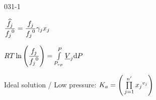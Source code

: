 \begin{mitframe}{031-1}
\begin{listone}
\begin{listtwo}
\begin{listthree}
\begin{listfour}
                \item $\dfrac{\widehat{\fug}_{j}}{{\fug_{j}}^{\init}}=\dfrac{\fug_{j}}{{\fug_{j}}^{\init}} \gamma_{j} x_{j}$
                
                \item $\gasconst\Temp\ln\Bigg(\dfrac{\fug_{j}}{{\fug_{j}}^{\init}}\Bigg)=\int\limits_{\p_{vp}}^{\p}\uline{\vol}_{j}\mathrm{d}\p$
                
                \item Ideal solution / Low pressure: $\eqconst = \Bigg(\prod\limits_{j=1}^{n'}{x_{j}}^{\vvel_{j}}\Bigg)$
                
                

			\end{listfour}                        

		\end{listthree}                        
    
    \end{listtwo}     
    
\end{listone}			

\end{mitframe}